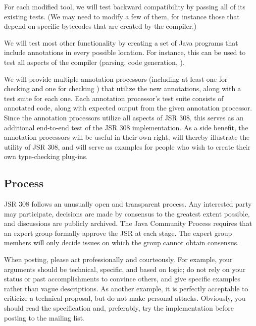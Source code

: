 \documentclass[10pt]{article}
\begin{document}
For each modified tool, we will test backward compatibility by passing all
of its existing tests.  (We may need to modify a few of them, for instance
those that depend on specific bytecodes that are created by the compiler.)

We will test most other functionality by creating a set of Java programs
that include annotations in every possible location.  For instance, this
can be used to test all aspects of the compiler (parsing, code generation,
).


We will provide multiple annotation processors (including at least one for
checking  and one for checking ) that
utilize the new annotations, along with a test suite for each one.  Each
annotation processor's test suite consists of annotated code, along with
expected output from the given annotation processor.  Since the annotation
processors utilize all aspects of JSR 308, this serves as an additional
end-to-end test of the JSR 308 implementation.  As a side benefit, the
annotation processors will be useful in their own right, will thereby
illustrate the utility of JSR 308, and will serve as examples for people
who wish to create their own type-checking plug-ins.



\subsection{Process\label{process}}

JSR 308 follows an unusually  open and transparent process.  Any interested
party may participate, decisions are made by consensus
to the greatest extent possible, and discussions
are publicly archived.  The Java Community Process requires that an
expert group formally approve the JSR at
each stage.  The expert group members will only decide issues on which the
group cannot obtain consensus.

When posting, please act
professionally and courteously.  For example, your arguments should be
technical, specific, and based on logic; do not rely on your status or past
accomplishments to convince others, and give specific examples rather
than vague descriptions.  As another example, it is perfectly acceptable to
criticize a technical proposal, but do not make personal attacks.
Obviously, you should read the specification
and, preferably, try the implementation before posting to the mailing list.
\end{document}
